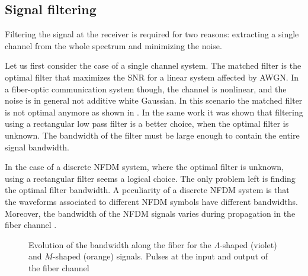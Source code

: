 \subsection{Signal filtering}\label{sec:nfdm_signal_filtering}
Filtering the signal at the receiver is required for two reasons: extracting a single channel from the whole spectrum and minimizing the noise.

Let us first consider the case of a single channel system. The matched filter is the optimal filter that maximizes the \ac{SNR} for a linear system affected by \ac{AWGN}. In a fiber-optic communication system though, the channel is nonlinear, and the noise is in general not additive white Gaussian. In this scenario the matched filter is not optimal anymore as shown in \cite{liga2015optimum}. In the same work it was shown that filtering using a rectangular low pass filter is a better choice, when the optimal filter is unknown. The bandwidth of the filter must be large enough to contain the entire signal bandwidth.

In the case of a discrete \ac{NFDM} system, where the optimal filter is unknown, using a
rectangular filter seems a logical choice. The only problem left
is finding the optimal filter bandwidth. A peculiarity of a discrete \ac{NFDM} system
is that the waveforms associated to different \ac{NFDM} symbols have different
bandwidths. Moreover, the bandwidth of the \ac{NFDM} signals varies
during propagation in the fiber channel \cite{gui2016phase}.

\begin{figure}[!t]
  \centering
  \figuresvspace
  \raggedright
  \hspace{0.5mm}
  \hspace{5mm}

  \caption{ Evolution of the bandwidth along the fiber for the $\Lambda$-shaped (violet) and $M$-shaped (orange) signals. Pulses at the input  and output  of the fiber channel}
  \label{fig:bandwidth_evolution}
\end{figure}

